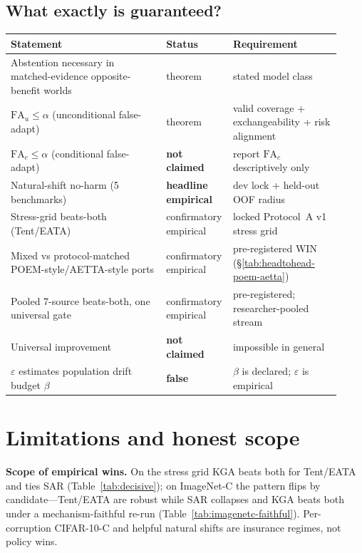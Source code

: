 \documentclass[conference]{IEEEtran}
\theoremstyle{plain}
\theoremstyle{definition}
\theoremstyle{remark}
\begin{document}
\subsection{What exactly is guaranteed?}\label{sec:guarantees}
\begin{center}
\footnotesize
\renewcommand{\arraystretch}{1.12}
\begin{tabular}{@{}p{0.46\linewidth}p{0.14\linewidth}p{0.32\linewidth}@{}}
\toprule
Statement & Status & Requirement \\
\midrule
Abstention necessary in matched-evidence opposite-benefit worlds & theorem & stated model class \\
$\mathrm{FA}_u \le \alpha$ (unconditional false-adapt) & theorem & valid coverage + exchangeability + risk alignment \\
$\mathrm{FA}_c \le \alpha$ (conditional false-adapt) & \textbf{not claimed} & report $\mathrm{FA}_c$ descriptively only \\
Natural-shift no-harm (5 benchmarks) & \textbf{headline empirical} & dev lock + held-out OOF radius \\
Stress-grid beats-both (Tent/EATA) & confirmatory empirical & locked Protocol~A v1 stress grid \\
Mixed vs protocol-matched POEM-style/AETTA-style ports & confirmatory empirical & pre-registered WIN (\S\ref{tab:headtohead-poem-aetta}) \\
Pooled 7-source beats-both, one universal gate & confirmatory empirical & pre-registered; researcher-pooled stream \\
Universal improvement & \textbf{not claimed} & impossible in general \\
$\varepsilon$ estimates population drift budget $\beta$ & \textbf{false} & $\beta$ is declared; $\varepsilon$ is empirical \\
\bottomrule
\end{tabular}
\end{center}

\section{Limitations and honest scope}\label{sec:limits}

\medskip
\textbf{Scope of empirical wins.} On the stress grid \textsc{KGA} beats both for Tent/EATA
and ties SAR (Table~\ref{tab:decisive}); on ImageNet-C the pattern flips by candidate---Tent/EATA
are robust while SAR collapses and \textsc{KGA} beats both under a mechanism-faithful re-run
(Table~\ref{tab:imagenetc-faithful}). Per-corruption CIFAR-10-C and helpful natural shifts are
insurance regimes, not policy wins.
\end{document}
